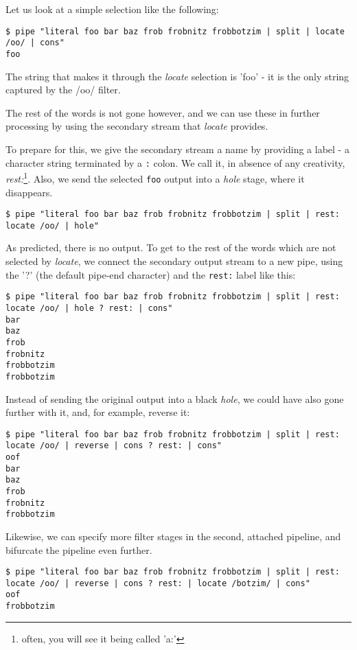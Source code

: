 Let us look at a simple selection like the following:

\begin{lstlisting}
$ pipe "literal foo bar baz frob frobnitz frobbotzim | split | locate /oo/ | cons"
foo
\end{lstlisting}
The string that makes it through the \emph{locate} selection is 'foo' -
it is the only string captured by the /oo/ filter.

The rest of the words is not gone however, and we can use these in
further processing by using the secondary stream that \emph{locate}
provides.

To prepare for this, we give the secondary stream a name by providing
a label - a character string terminated by a \texttt{:} colon. We call it, in absence of any creativity,
\emph{rest:}\footnote{often, you will see it being called 'a:'}. Also, we send the selected \texttt{foo} output into a
\emph{hole} stage, where it disappears.
\begin{lstlisting}
$ pipe "literal foo bar baz frob frobnitz frobbotzim | split | rest: locate /oo/ | hole"
\end{lstlisting}

As predicted, there is no output. To get to the rest of the words which are not selected
by \emph{locate}, we connect the secondary output stream to
a new pipe, using the '?' (the default pipe-end character) and the \texttt{rest:} label like this:
\begin{lstlisting}
$ pipe "literal foo bar baz frob frobnitz frobbotzim | split | rest: locate /oo/ | hole ? rest: | cons"
bar
baz
frob
frobnitz
frobbotzim
frobbotzim
\end{lstlisting}

Instead of sending the original output into a black \emph{hole}, we
could have also gone further with it, and, for example, reverse it:
\begin{lstlisting}
$ pipe "literal foo bar baz frob frobnitz frobbotzim | split | rest: locate /oo/ | reverse | cons ? rest: | cons"
oof
bar
baz
frob
frobnitz
frobbotzim
\end{lstlisting}
Likewise, we can specify more filter stages in the second, attached
pipeline, and bifurcate the pipeline even further.

\begin{lstlisting}
$ pipe "literal foo bar baz frob frobnitz frobbotzim | split | rest: locate /oo/ | reverse | cons ? rest: | locate /botzim/ | cons"
oof
frobbotzim
\end{lstlisting}

